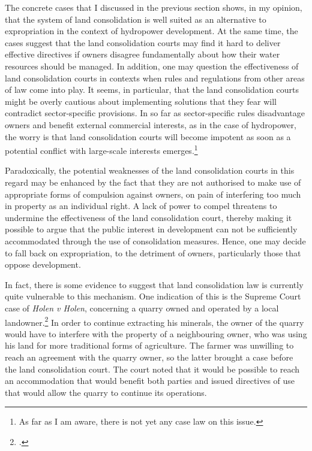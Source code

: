 The concrete cases that I discussed in the previous section shows, in my opinion, that the system of land consolidation is well suited as an alternative to expropriation in the context of hydropower development. At the same time, the cases suggest that the land consolidation courts may find it hard to deliver effective directives if owners disagree fundamentally about how their water resources should be managed. In addition, one may question the effectiveness of land consolidation courts in contexts when rules and regulations from other areas of law come into play. It seems, in particular, that the land consolidation courts might be overly cautious about implementing solutions that they fear will contradict sector-specific provisions. In so far as sector-specific rules disadvantage owners and benefit external commercial interests, as in the case of hydropower, the worry is that land consolidation courts will become impotent as soon as a potential conflict with large-scale interests emerges.\footnote{As far as I am aware, there is not yet any case law on this issue.}

Paradoxically, the potential weaknesses of the land consolidation courts in this regard may be enhanced by the fact that they are not authorised to make use of appropriate forms of compulsion against owners, on pain of interfering too much in property as an individual right. A lack of power to compel threatens to undermine the effectiveness of the land consolidation court, thereby making it possible to argue that the public interest in development can not be sufficiently accommodated through the use of consolidation measures. Hence, one may decide to fall back on expropriation, to the detriment of owners, particularly those that oppose development.

In fact, there is some evidence to suggest that land consolidation law is currently quite vulnerable to this mechanism. One indication of this is the Supreme Court case of {\it Holen v Holen}, concerning a quarry owned and operated by a local landowner.\footcite{holen95} In order to continue extracting his minerals, the owner of the quarry would have to interfere with the property of a neighbouring owner, who was using his land for more traditional forms of agriculture. The farmer was unwilling to reach an agreement with the quarry owner, so the latter brought a case before the land consolidation court. The court noted that it would be possible to reach an accommodation that would benefit both parties and issued directives of use that would allow the quarry to continue its operations.

